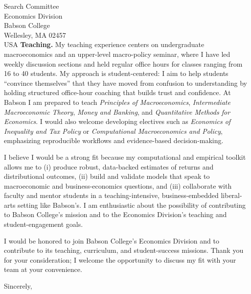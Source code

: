 \documentclass[11pt,letterpaper]{letter}
\begin{document}
\begin{letter}{Search Committee \\
Economics Division \\
Babson College \\
Wellesley, MA 02457 \\ USA}
\textbf{Teaching.} My teaching experience centers on undergraduate macroeconomics and an upper-level macro-policy seminar, where I have led weekly discussion sections and held regular office hours for classes ranging from 16 to 40 students. My approach is student-centered: I aim to help students “convince themselves” that they have moved from confusion to understanding by holding structured office-hour coaching that builds trust and confidence. At Babson I am prepared to teach \textit{Principles of Macroeconomics}, \textit{Intermediate Macroeconomic Theory}, \textit{Money and Banking}, and \textit{Quantitative Methods for Economics}. I would also welcome developing electives such as \textit{Economics of Inequality and Tax Policy} or \textit{Computational Macroeconomics and Policy}, emphasizing reproducible workflows and evidence-based decision-making.

I believe I would be a strong fit because my computational and empirical toolkit allows me to (i) produce robust, data-backed estimates of returns and distributional outcomes, (ii) build and validate models that speak to macroeconomic and business-economics questions, and (iii) collaborate with faculty and mentor students in a teaching-intensive, business-embedded liberal-arts setting like Babson’s. I am enthusiastic about the possibility of contributing to Babson College’s mission and to the Economics Division’s teaching and student-engagement goals.

I would be honored to join Babson College’s Economics Division and to contribute to its teaching, curriculum, and student-success missions. Thank you for your consideration; I welcome the opportunity to discuss my fit with your team at your convenience.

\closing{Sincerely,}

\end{letter}
\end{document}
